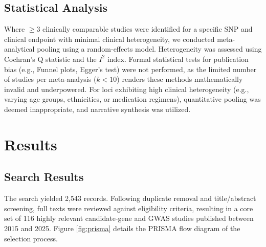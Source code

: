 \documentclass[11pt,a4paper]{article}
\begin{document}
\subsection{Statistical Analysis}
Where $\ge3$ clinically comparable studies were identified for a specific SNP and clinical endpoint with minimal clinical heterogeneity, we conducted meta-analytical pooling using a random-effects model. Heterogeneity was assessed using Cochran's Q statistic and the $I^2$ index. Formal statistical tests for publication bias (e.g., Funnel plots, Egger's test) were not performed, as the limited number of studies per meta-analysis ($k < 10$) renders these methods mathematically invalid and underpowered. For loci exhibiting high clinical heterogeneity (e.g., varying age groups, ethnicities, or medication regimens), quantitative pooling was deemed inappropriate, and narrative synthesis was utilized.

\section{Results}

\subsection{Search Results}
The search yielded 2,543 records. Following duplicate removal and title/abstract screening, full texts were reviewed against eligibility criteria, resulting in a core set of 116 highly relevant candidate-gene and GWAS studies published between 2015 and 2025. Figure \ref{fig:prisma} details the PRISMA flow diagram of the selection process.
\end{document}
